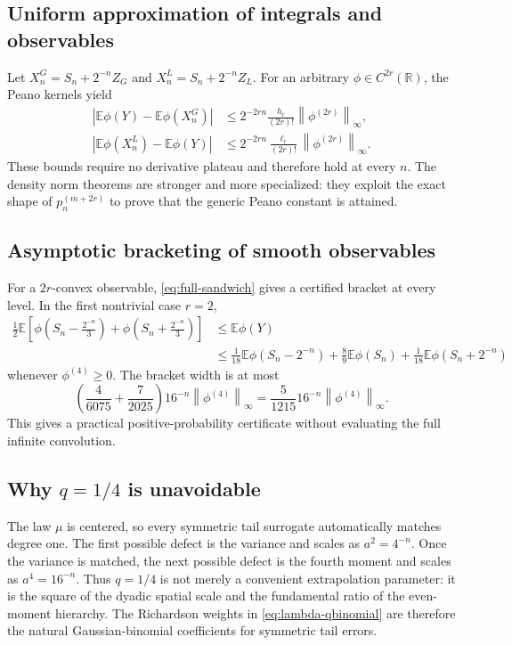 \documentclass[11pt]{article}
\numberwithin{equation}{section}
\theoremstyle{definition}
\theoremstyle{remark}
\newcommand{\R}{\mathbb R}
\newcommand{\E}{\mathbb E}
\newcommand{\abs}[1]{\left|#1\right|}
\newcommand{\norm}[1]{\left\lVert#1\right\rVert}
\begin{document}
\subsection{Uniform approximation of integrals and observables}

Let $X_n^G=S_n+2^{-n}Z_G$ and $X_n^L=S_n+2^{-n}Z_L$.  For an arbitrary $\phi\in C^{2r}(\R)$, the Peano kernels yield
\begin{align}
 \abs{\E\phi(Y)-\E\phi(X_n^G)}
 &\le 2^{-2rn}\frac{h_r}{(2r)!}\norm{\phi^{(2r)}}_\infty,
 \label{eq:weak-G-full}\\
 \abs{\E\phi(X_n^L)-\E\phi(Y)}
 &\le 2^{-2rn}\frac{\ell_r}{(2r)!}\norm{\phi^{(2r)}}_\infty.
 \label{eq:weak-L-full}
\end{align}
These bounds require no derivative plateau and therefore hold at every $n$.  The density norm theorems are stronger and more specialized: they exploit the exact shape of $p_n^{(m+2r)}$ to prove that the generic Peano constant is attained.

\subsection{Asymptotic bracketing of smooth observables}

For a $2r$-convex observable, \eqref{eq:full-sandwich} gives a certified bracket at every level.  In the first nontrivial case $r=2$,
\begin{align}
 \frac12\E\left[
 \phi\!\left(S_n-\frac{2^{-n}}3\right)
 +\phi\!\left(S_n+\frac{2^{-n}}3\right)
 \right]
 &\le \E\phi(Y)\nonumber\\
 &\le
 \frac1{18}\E\phi(S_n-2^{-n})
 +\frac89\E\phi(S_n)
 +\frac1{18}\E\phi(S_n+2^{-n})
 \label{eq:r2-observable-bracket}
\end{align}
whenever $\phi^{(4)}\ge0$.  The bracket width is at most
\begin{equation}
 \left(\frac4{6075}+\frac7{2025}\right)16^{-n}
 \norm{\phi^{(4)}}_\infty
 =\frac5{1215}16^{-n}\norm{\phi^{(4)}}_\infty.
 \label{eq:r2-bracket-width}
\end{equation}
This gives a practical positive-probability certificate without evaluating the full infinite convolution.

\subsection{Why $q=1/4$ is unavoidable}

The law $\mu$ is centered, so every symmetric tail surrogate automatically matches degree one.  The first possible defect is the variance and scales as $a^2=4^{-n}$.  Once the variance is matched, the next possible defect is the fourth moment and scales as $a^4=16^{-n}$.  Thus $q=1/4$ is not merely a convenient extrapolation parameter: it is the square of the dyadic spatial scale and the fundamental ratio of the even-moment hierarchy.  The Richardson weights in \eqref{eq:lambda-qbinomial} are therefore the natural Gaussian-binomial coefficients for symmetric tail errors.
\end{document}
